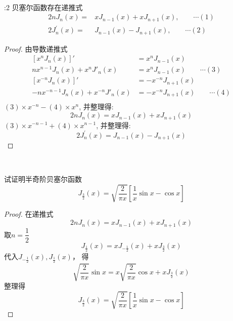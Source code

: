  ~~\\ 

 \begin{proposition}:2 贝塞尔函数存在递推式	
	\begin{equation*}
		\begin{split}
			2 n J_{n}(x)=&xJ_{n-1}(x)+x J_{n+1}(x) ,\qquad \cdots (1) \\
			2 J_{n}^{\prime}(x)=&J_{n-1}(x)-J_{n+1}(x) ,\qquad \cdots (2) 
		\end{split}
	\end{equation*}
\end{proposition}
\begin{proof} 由导数递推式
	\begin{equation*}
		\begin{split}
			[x^n J_n(x)]' & = x^n J_{n-1}(x)  \\
			n x^{n-1} J_n(x) + x^n J'_n(x) & = x^n J_{n-1}(x) \qquad \cdots (3) \\
			[x ^{-n}  J_n(x)]' & = -x ^{-n}  J_{n+1}(x)  \\
			-n x^{-n-1} J_n(x) + x ^{-n} J'_n(x) & = -x ^{-n}  J_{n+1}(x) \qquad \cdots (4)  \\
		\end{split}
	\end{equation*}	
	$ (3)\times x ^{-n} - (4)\times x ^{n}  $, 并整理得:
	\begin{equation*}
		2 n J_{n}(x)=x J_{n-1}(x)+x J_{n+1}(x) 
	\end{equation*}	 	
	$ (3)\times x^{-n-1} + (4)\times x^{n-1}  $, 并整理得:
	\begin{equation*}
	2 J_{n}^{\prime}(x)=J_{n-1}(x)-J_{n+1}(x) 
	\end{equation*}	 
\end{proof}
 ~~\\ 

 \begin{example}
 试证明半奇阶贝塞尔函数
 \[J_{\frac{3}{2}} (x) = \sqrt{\frac{2}{\pi x}} \left[ \frac{1}{x} \sin x -\cos x\right]\]
 \end{example}
 \begin{proof}
 在递推式
 \[2 n J_{n} (x)= xJ_{n-1} (x)+x J_{n+1} (x)\]
取$n=\dfrac{1}{2}$
\[J_{\frac{1}{2}} (x)= xJ_{-\frac{1}{2}} (x)+x J_{\frac{3}{2}} (x)\]
代入$J_{-\frac{1}{2}} (x), J_{\frac{1}{2}} (x)$， 得
\[\sqrt{\frac{2}{\pi x}} \sin x= x \sqrt{\frac{2}{\pi x}} \cos x+x J_{\frac{3}{2}} (x)\]
整理得
\[J_{\frac{3}{2}} (x) = \sqrt{\frac{2}{\pi x}} \left[ \frac{1}{x} \sin x -\cos x\right]\]
\end{proof}
 ~~\\ 

